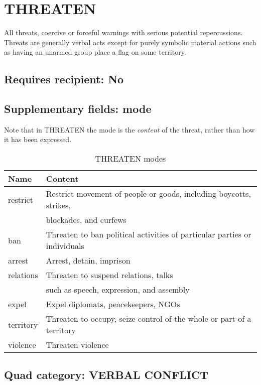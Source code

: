\documentclass[11pt]{report}
\newcommand{\plcat}[1]{\textsf{#1}}
\newcommand{\ti}[1]{\textit{#1}}
\begin{document}
\newpage


\section{THREATEN}

All threats, coercive or forceful warnings with serious potential repercussions. Threats are generally verbal acts except for purely symbolic material actions such as having an unarmed group place a flag on some territory.
\subsection{Requires recipient: No}

\subsection{Supplementary fields: mode}

Note that in \plcat{THREATEN} the mode is the \ti{content} of the threat, rather than how it has been expressed.

\begin{table}[htp]
\caption{THREATEN modes}
\begin{center}
\begin{tabular}{|l|l|}
\hline
Name & Content \\
\hline
restrict & Restrict movement of people or goods, including boycotts, strikes,  \\
& blockades, and curfews \\
ban & Threaten to ban political activities of particular parties or individuals \\
arrest & Arrest, detain, imprison \\
relations & Threaten to suspend relations, talks \\
& such as speech, expression, and assembly\\
expel & Expel diplomats, peacekeepers, NGOs \\
territory & Threaten to occupy, seize control of the whole or part of a territory \\
violence & Threaten violence \\
\hline
\end{tabular}
\end{center}
\label{tab:threatmode}
\end{table}%

\subsection{Quad category: VERBAL CONFLICT}
\end{document}
